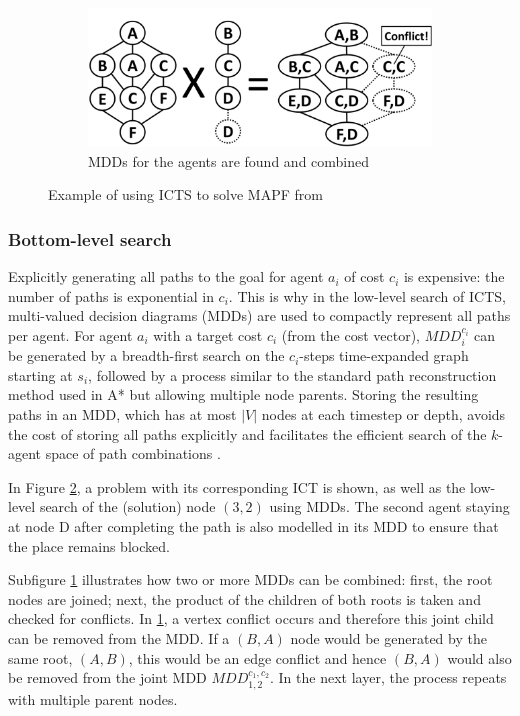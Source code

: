 \documentclass[english]{article}
\begin{document}
\begin{figure}[b]
		\begin{subfigure}{0.4\textwidth}
			\centering
			\includegraphics[width=\linewidth]{img/mdds}
			\caption{MDDs for the agents are found and combined}
			\label{fig:mdds}
		\end{subfigure}
		
		\caption{Example of using ICTS to solve MAPF from \cite{sharon2011}}
		\label{fig:bottom}
	\end{figure}
	\subsubsection{Bottom-level search}
	Explicitly generating all paths to the goal for agent $a_i$ of cost $c_i$ is expensive: the number of paths is exponential in $c_i$. This is why in the low-level search of ICTS, multi-valued decision diagrams (MDDs) are used to compactly represent all paths per agent. For agent $a_i$ with a target cost $c_i$ (from the cost vector), $MDD_i^{c_i}$ can be generated by a breadth-first search on the $c_i$-steps time-expanded graph starting at $s_i$, followed by a process similar to the standard path reconstruction method used in A* but allowing multiple node parents. Storing the resulting paths in an MDD, which has at most $|V|$ nodes at each timestep or depth, avoids the cost of storing all paths explicitly and facilitates the efficient search of the $k$-agent space of path combinations \cite{sharon2011}.
	
	In Figure \ref{fig:bottom}, a problem with its corresponding ICT is shown, as well as the low-level search of the (solution) node $(3,2)$ using MDDs. The second agent staying at node D after completing the path is also modelled in its MDD to ensure that the place remains blocked.
	
	Subfigure \ref{fig:mdds} illustrates how two or more MDDs can be combined: first, the root nodes are joined; next, the product of the children of both roots is taken and checked for conflicts. In \ref{fig:mdds}, a vertex conflict occurs and therefore this joint child can be removed from the MDD. If a $(B,A)$ node would be generated by the same root, $(A,B)$, this would be an edge conflict and hence $(B,A)$ would also be removed from the joint MDD $MDD_{1,2}^{c_1,c_2}$. In the next layer, the process repeats with multiple parent nodes.
	
\end{document}
